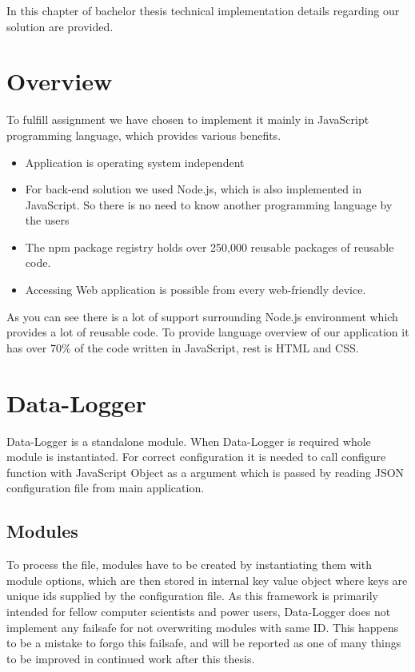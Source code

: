 In this chapter of bachelor thesis technical implementation details regarding our solution are provided.
\section{Overview} %
\label{sec:overview}
To fulfill assignment we have chosen to implement it mainly in JavaScript programming language, which provides various benefits.
\begin{itemize}
\item Application is operating system independent
\item For back-end solution we used Node.js, which is also implemented in JavaScript. So there is no need to know another programming language by the users
\item The npm package registry holds over 250,000 reusable packages of reusable code.
\item Accessing Web application is possible from every web-friendly device.
\end{itemize}
As you can see there is a lot of support surrounding Node.js environment which provides a lot of reusable code. To provide language overview of our application it has over 70\% of the code written in JavaScript, rest is HTML and CSS.
\section{Data-Logger} %
\label{sec:data_logger}
Data-Logger is a standalone module. When Data-Logger is required whole module is instantiated. For correct configuration it is needed to call configure function with JavaScript Object as a argument which is passed by reading JSON configuration file from main application.
\subsection{Modules} %
\label{sub:modules}
To process the file, modules have to be created by instantiating them with module options, which are then stored in internal key value object where keys are unique ids supplied by the configuration file. As this framework is primarily intended for fellow computer scientists and power users, Data-Logger does not implement any failsafe for not overwriting modules with same ID. This happens to be a mistake to forgo this failsafe, and will be reported as one of many things to be improved in continued work after this thesis.
